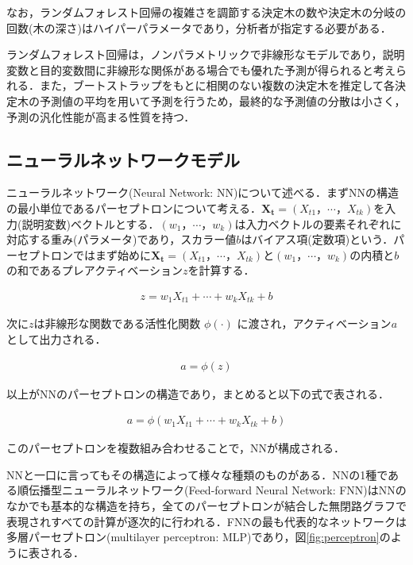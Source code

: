 \documentclass[a4paper，12pt]{jsarticle}
\begin{document}
なお，ランダムフォレスト回帰の複雑さを調節する決定木の数や決定木の分岐の回数(木の深さ)はハイパーパラメータであり，分析者が指定する必要がある．

ランダムフォレスト回帰は，ノンパラメトリックで非線形なモデルであり，説明変数と目的変数間に非線形な関係がある場合でも優れた予測が得られると考えられる．また，ブートストラップをもとに相関のない複数の決定木を推定して各決定木の予測値の平均を用いて予測を行うため，最終的な予測値の分散は小さく，予測の汎化性能が高まる性質を持つ．

\subsection{ニューラルネットワークモデル}

ニューラルネットワーク(Neural Network: NN)について述べる．まずNNの構造の最小単位であるパーセプトロンについて考える．$\bm{X_t}=(X_{t1}，\cdots，X_{tk})$を入力(説明変数)ベクトルとする．$(w_1，\cdots，w_k)$は入力ベクトルの要素それぞれに対応する重み(パラメータ)であり，スカラー値$b$はバイアス項(定数項)という．パーセプトロンではまず始めに$\bm{X_t}=(X_{t1}，\cdots，X_{tk})$と$(w_1，\cdots，w_k)$の内積と$b$の和であるプレアクティベーション$z$を計算する．

\begin{equation}
  \begin{split}
    z = w_1 X_{t1} + \cdots + w_k X_{tk} + b
  \end{split}
\end{equation}

次に$z$は非線形な関数である活性化関数 $\phi(\cdot)$ に渡され，アクティベーション$a$として出力される．

\begin{equation}
  \begin{split}
    a = \phi(z)
  \end{split}
\end{equation}

以上がNNのパーセプトロンの構造であり，まとめると以下の式で表される．

\begin{equation}
  \begin{split}
    a = \phi \left(w_1 X_{t1} + \cdots + w_k X_{tk} + b \right)
  \end{split}
\end{equation}

このパーセプトロンを複数組み合わせることで，NNが構成される．

NNと一口に言ってもその構造によって様々な種類のものがある．NNの1種である順伝播型ニューラルネットワーク(Feed-forward Neural Network: FNN)はNNのなかでも基本的な構造を持ち，全てのパーセプトロンが結合した無閉路グラフで表現されすべての計算が逐次的に行われる．FNNの最も代表的なネットワークは多層パーセプトロン(multilayer perceptron: MLP)であり，図\ref{fig:perceptron}のように表される．
\end{document}
